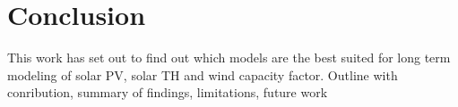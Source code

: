 \section{Conclusion}
This work has set out to find out which models are the best suited for long term modeling of solar PV, solar TH and wind capacity factor. 
Outline with conribution, summary of findings, limitations, future work
